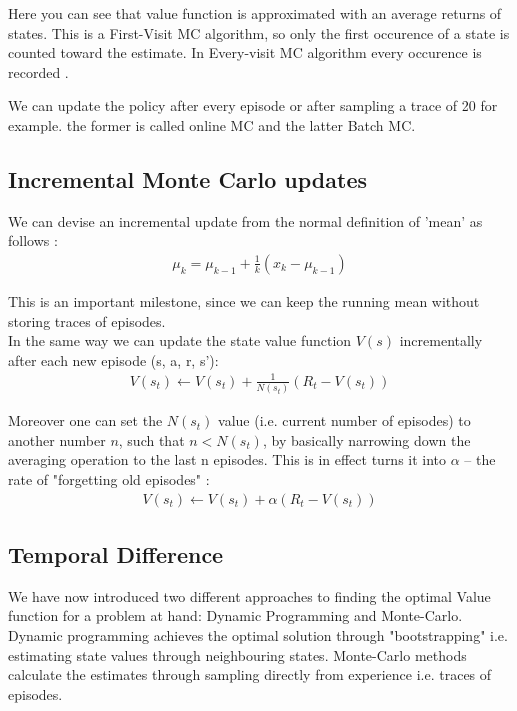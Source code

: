 Here you can see that value function is approximated with an average returns of states. This is a First-Visit MC algorithm, so only the first occurence of a state is counted toward the estimate. In Every-visit MC algorithm every occurence is recorded \cite{lecture_mfl}.

We can update the policy after every episode or after
sampling a trace of 20 for example. the former is called online MC and the latter Batch MC.

\subsection{Incremental Monte Carlo updates}
We can devise an incremental update from the normal definition of 'mean' as follows \cite{lecture_mfl} :
\begin{align}
    \mu_k = \mu_{k - 1} + \frac{1}{k} (x_k - \mu_{k - 1})
\end{align}

This is an important milestone, since we can keep the running mean without storing traces of episodes. \\

In the same way we can update the state value function $V(s)$ incrementally after each new episode (s, a, r, s'):
\begin{align}
    V(s_t) \longleftarrow V(s_t) + \frac{1}{N(s_t)}(R_t - V(s_t))
\end{align}

Moreover one can set the $N(s_t)$ value (i.e. current number of episodes) to another number $n$, such that $n < N(s_t)$, by basically narrowing down the averaging operation to the last n episodes. This is in effect turns it into $\alpha$ -- the rate of "forgetting old episodes" \cite{lecture_mfl}:
\begin{align}
    V(s_t) \longleftarrow V(s_t) + \alpha (R_t - V(s_t)) \label{eq:mc_increment}
\end{align}

\subsection{Temporal Difference}
We have now introduced two different approaches to finding the optimal Value function for a problem at hand: Dynamic Programming and Monte-Carlo. Dynamic programming achieves the optimal solution through "bootstrapping" i.e. estimating state values through
neighbouring states. Monte-Carlo methods calculate the estimates through sampling directly from experience i.e. traces of episodes. \\


